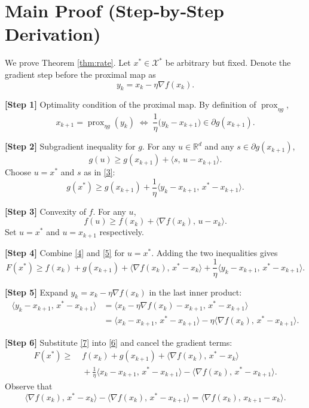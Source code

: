 \documentclass{article}
\begin{document}
\section*{Main Proof (Step‑by‑Step Derivation)}
We prove Theorem \ref{thm:rate}.  
Let $x^{*}\in\mathcal X^{*}$ be arbitrary but fixed.  
Denote the gradient step before the proximal map as
\[
y_{k}=x_{k}-\eta\nabla f(x_{k}). \tag{2}
\]

\noindent\textbf{[Step 1]} Optimality condition of the proximal map.  
By definition of $\operatorname{prox}_{\eta g}$,
\[
x_{k+1}= \operatorname{prox}_{\eta g}(y_{k})
\;\Longleftrightarrow\;
\frac{1}{\eta}\bigl(y_{k}-x_{k+1}\bigr)\in\partial g(x_{k+1}). \tag{3}
\]

\noindent\textbf{[Step 2]} Subgradient inequality for $g$.  
For any $u\in\mathbb R^{d}$ and any $s\in\partial g(x_{k+1})$,
\[
g(u)\ge g(x_{k+1})+\langle s,\,u-x_{k+1}\rangle .
\] 
Choose $u=x^{*}$ and $s$ as in \eqref{3}:
\[
g(x^{*})\ge g(x_{k+1})+\frac{1}{\eta}\langle y_{k}-x_{k+1},\,x^{*}-x_{k+1}\rangle . \tag{4}
\]

\noindent\textbf{[Step 3]} Convexity of $f$.  
For any $u$,
\[
f(u)\ge f(x_{k})+\langle \nabla f(x_{k}),\,u-x_{k}\rangle . \tag{5}
\]
Set $u=x^{*}$ and $u=x_{k+1}$ respectively.

\noindent\textbf{[Step 4]} Combine \eqref{4} and \eqref{5} for $u=x^{*}$.  
Adding the two inequalities gives
\[
F(x^{*})\ge f(x_{k})+g(x_{k+1})
+\langle \nabla f(x_{k}),\,x^{*}-x_{k}\rangle
+\frac{1}{\eta}\langle y_{k}-x_{k+1},\,x^{*}-x_{k+1}\rangle . \tag{6}
\]

\noindent\textbf{[Step 5]} Expand $y_{k}=x_{k}-\eta\nabla f(x_{k})$ in the last inner product:
\[
\begin{aligned}
\langle y_{k}-x_{k+1},\,x^{*}-x_{k+1}\rangle
&=\langle x_{k}-\eta\nabla f(x_{k})-x_{k+1},\,x^{*}-x_{k+1}\rangle\\
&=\langle x_{k}-x_{k+1},\,x^{*}-x_{k+1}\rangle
-\eta\langle \nabla f(x_{k}),\,x^{*}-x_{k+1}\rangle .
\end{aligned} \tag{7}
\]

\noindent\textbf{[Step 6]} Substitute \eqref{7} into \eqref{6} and cancel the gradient terms:
\[
\begin{aligned}
F(x^{*})\ge&\; f(x_{k})+g(x_{k+1})
+\langle \nabla f(x_{k}),\,x^{*}-x_{k}\rangle\\
&\;+\frac{1}{\eta}\langle x_{k}-x_{k+1},\,x^{*}-x_{k+1}\rangle
-\langle \nabla f(x_{k}),\,x^{*}-x_{k+1}\rangle .
\end{aligned}
\] 
Observe that 
\[
\langle \nabla f(x_{k}),\,x^{*}-x_{k}\rangle-\langle \nabla f(x_{k}),\,x^{*}-x_{k+1}\rangle
=\langle \nabla f(x_{k}),\,x_{k+1}-x_{k}\rangle . \tag{8}
\]
\end{document}
